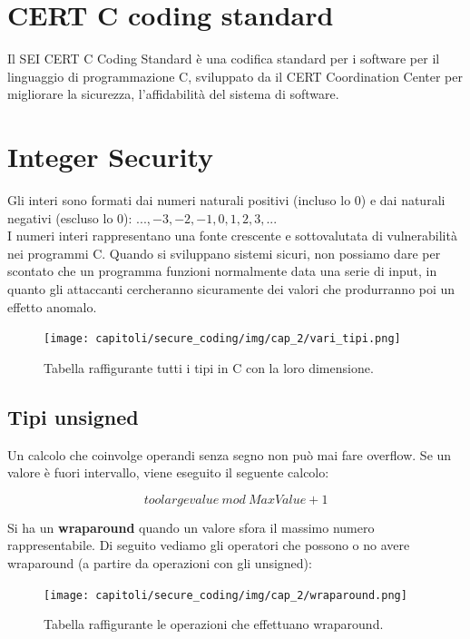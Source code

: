 \section{CERT C coding standard}

Il SEI CERT C Coding Standard è una codifica standard per i software per il
linguaggio di programmazione C, sviluppato da il CERT Coordination Center per
migliorare la sicurezza, l'affidabilità del sistema di software.

\section{Integer Security}

Gli interi sono formati dai numeri naturali positivi (incluso lo 0) e dai naturali
negativi (escluso lo 0): $..., -3, -2, -1, 0, 1, 2, 3, ...$\\
I numeri interi rappresentano una fonte crescente e sottovalutata di vulnerabilità
nei programmi C. Quando si sviluppano sistemi sicuri, non possiamo dare per scontato
che un programma funzioni normalmente data una serie di input,
in quanto gli attaccanti cercheranno sicuramente dei valori che produrranno
poi un effetto anomalo.

\begin{figure}[H]
    \centering
    \texttt{[image: capitoli/secure\_coding/img/cap\_2/vari\_tipi.png]}
    \caption{Tabella raffigurante tutti i tipi in C con la loro dimensione.}\label{fig:vari_tipi}
\end{figure}

\subsection{Tipi unsigned}

Un calcolo che coinvolge operandi senza segno non può mai fare overflow.
Se un valore è fuori intervallo, viene eseguito il seguente calcolo:

\[
    toolargevalue \ mod \ MaxValue + 1
\]

Si ha un \textbf{wraparound} quando un valore sfora il massimo numero
rappresentabile. Di seguito vediamo gli operatori che possono o no avere
wraparound (a partire da operazioni con gli unsigned):

\begin{figure}[H]
    \centering
    \texttt{[image: capitoli/secure\_coding/img/cap\_2/wraparound.png]}
    \caption{Tabella raffigurante le operazioni che effettuano wraparound.}
\end{figure}

